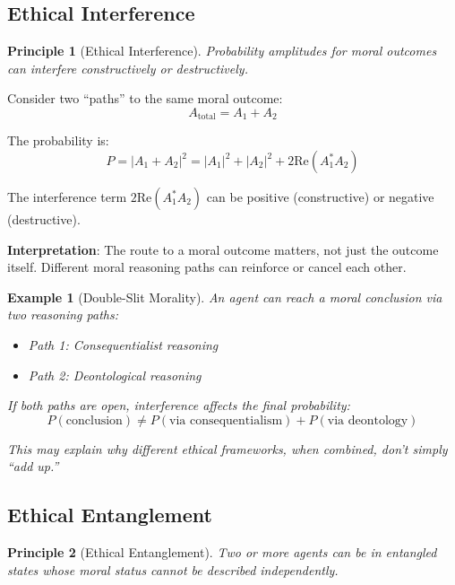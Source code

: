 \documentclass[12pt]{article}
\newtheorem{principle}{Principle}
\newtheorem{example}{Example}[section]
\begin{document}
\subsection{Ethical Interference}

\begin{principle}[Ethical Interference]
\emph{Probability amplitudes for moral outcomes can interfere constructively or destructively.}
\end{principle}

Consider two ``paths'' to the same moral outcome:
\begin{equation}
    A_{\text{total}} = A_1 + A_2
\end{equation}

The probability is:
\begin{equation}
    P = |A_1 + A_2|^2 = |A_1|^2 + |A_2|^2 + 2\mathrm{Re}(A_1^* A_2)
\end{equation}

The interference term $2\mathrm{Re}(A_1^* A_2)$ can be positive (constructive) or negative (destructive).

\textbf{Interpretation}: The route to a moral outcome matters, not just the outcome itself. Different moral reasoning paths can reinforce or cancel each other.

\begin{example}[Double-Slit Morality]
An agent can reach a moral conclusion via two reasoning paths:
\begin{itemize}
    \item Path 1: Consequentialist reasoning
    \item Path 2: Deontological reasoning
\end{itemize}

If both paths are open, interference affects the final probability:
\begin{equation}
    P(\text{conclusion}) \neq P(\text{via consequentialism}) + P(\text{via deontology})
\end{equation}

This may explain why different ethical frameworks, when combined, don't simply ``add up.''
\end{example}

\subsection{Ethical Entanglement}

\begin{principle}[Ethical Entanglement]
\emph{Two or more agents can be in entangled states whose moral status cannot be described independently.}
\end{principle}
\end{document}
